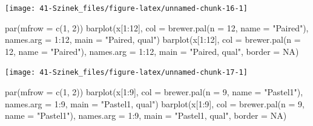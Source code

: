 \documentclass[
]{book}
\newenvironment{Shaded}{\begin{snugshade}}{\end{snugshade}}
\newcommand{\AttributeTok}[1]{\textcolor[rgb]{0.77,0.63,0.00}{#1}}
\newcommand{\ConstantTok}[1]{\textcolor[rgb]{0.00,0.00,0.00}{#1}}
\newcommand{\DecValTok}[1]{\textcolor[rgb]{0.00,0.00,0.81}{#1}}
\newcommand{\FunctionTok}[1]{\textcolor[rgb]{0.00,0.00,0.00}{#1}}
\newcommand{\NormalTok}[1]{#1}
\newcommand{\SpecialCharTok}[1]{\textcolor[rgb]{0.00,0.00,0.00}{#1}}
\newcommand{\StringTok}[1]{\textcolor[rgb]{0.31,0.60,0.02}{#1}}
\begin{document}
\begin{center}\texttt{[image: 41-Szinek\_files/figure-latex/unnamed-chunk-16-1]} \end{center}

\begin{Shaded}
\begin{Highlighting}[]
\FunctionTok{par}\NormalTok{(}\AttributeTok{mfrow =} \FunctionTok{c}\NormalTok{(}\DecValTok{1}\NormalTok{, }\DecValTok{2}\NormalTok{))}
\FunctionTok{barplot}\NormalTok{(x[}\DecValTok{1}\SpecialCharTok{:}\DecValTok{12}\NormalTok{], }\AttributeTok{col =} \FunctionTok{brewer.pal}\NormalTok{(}\AttributeTok{n =} \DecValTok{12}\NormalTok{, }\AttributeTok{name =} \StringTok{"Paired"}\NormalTok{), }\AttributeTok{names.arg =} \DecValTok{1}\SpecialCharTok{:}\DecValTok{12}\NormalTok{, }
    \AttributeTok{main =} \StringTok{"Paired, qual"}\NormalTok{)}
\FunctionTok{barplot}\NormalTok{(x[}\DecValTok{1}\SpecialCharTok{:}\DecValTok{12}\NormalTok{], }\AttributeTok{col =} \FunctionTok{brewer.pal}\NormalTok{(}\AttributeTok{n =} \DecValTok{12}\NormalTok{, }\AttributeTok{name =} \StringTok{"Paired"}\NormalTok{), }\AttributeTok{names.arg =} \DecValTok{1}\SpecialCharTok{:}\DecValTok{12}\NormalTok{, }
    \AttributeTok{main =} \StringTok{"Paired, qual"}\NormalTok{, }\AttributeTok{border =} \ConstantTok{NA}\NormalTok{)}
\end{Highlighting}
\end{Shaded}

\begin{center}\texttt{[image: 41-Szinek\_files/figure-latex/unnamed-chunk-17-1]} \end{center}

\begin{Shaded}
\begin{Highlighting}[]
\FunctionTok{par}\NormalTok{(}\AttributeTok{mfrow =} \FunctionTok{c}\NormalTok{(}\DecValTok{1}\NormalTok{, }\DecValTok{2}\NormalTok{))}
\FunctionTok{barplot}\NormalTok{(x[}\DecValTok{1}\SpecialCharTok{:}\DecValTok{9}\NormalTok{], }\AttributeTok{col =} \FunctionTok{brewer.pal}\NormalTok{(}\AttributeTok{n =} \DecValTok{9}\NormalTok{, }\AttributeTok{name =} \StringTok{"Pastel1"}\NormalTok{), }\AttributeTok{names.arg =} \DecValTok{1}\SpecialCharTok{:}\DecValTok{9}\NormalTok{, }
    \AttributeTok{main =} \StringTok{"Pastel1, qual"}\NormalTok{)}
\FunctionTok{barplot}\NormalTok{(x[}\DecValTok{1}\SpecialCharTok{:}\DecValTok{9}\NormalTok{], }\AttributeTok{col =} \FunctionTok{brewer.pal}\NormalTok{(}\AttributeTok{n =} \DecValTok{9}\NormalTok{, }\AttributeTok{name =} \StringTok{"Pastel1"}\NormalTok{), }\AttributeTok{names.arg =} \DecValTok{1}\SpecialCharTok{:}\DecValTok{9}\NormalTok{, }
    \AttributeTok{main =} \StringTok{"Pastel1, qual"}\NormalTok{, }\AttributeTok{border =} \ConstantTok{NA}\NormalTok{)}
\end{Highlighting}
\end{Shaded}
\end{document}
